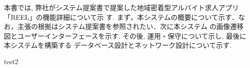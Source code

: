 本書では, 弊社がシステム提案書で提案した地域密着型アルバイト求人アプリ「REEL」の機能詳細について示
す. まず，本システムの概要について示す．なお，主張の根拠はシステム提案書を参照されたい．次に本システム
の画像遷移図とユーザーインターフェースを示す. その後, 運用・保守について示し, 最後に本システムを構築する
データベース設計とネットワーク設計について示す.

test2